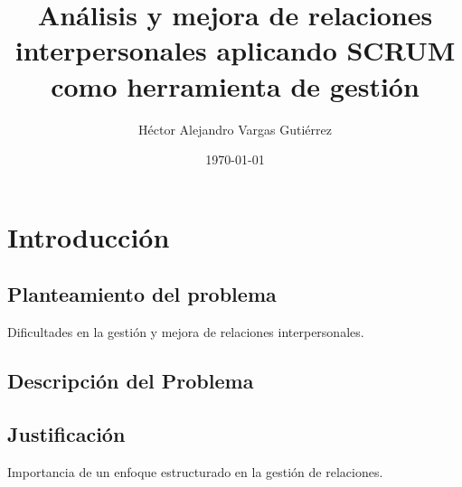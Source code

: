 \documentclass[letterpaper,12pt]{article} %
\title{Análisis y mejora de relaciones interpersonales aplicando SCRUM como herramienta de gestión}
\author{Héctor Alejandro Vargas Gutiérrez}
\date{\today}
\begin{document}
	
	\maketitle
	
	\tableofcontents %
	\newpage %
	
	\section{Introducción}
	\subsection{Planteamiento del problema}
	
	
	Dificultades en la gestión y mejora de relaciones interpersonales.
	
	\subsection{Descripción del Problema}
	
	
	\subsection{Justificación}
	
	
	
	Importancia de un enfoque estructurado en la gestión de relaciones.
		
\end{document}
